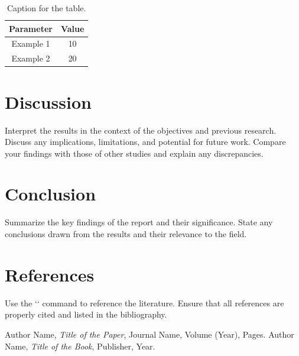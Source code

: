 \documentclass[12pt]{article}
\begin{document}
    \begin{table}[h!]
        \centering
        \begin{tabular}{|c|c|}
            \hline
            \textbf{Parameter} & \textbf{Value} \\
            \hline
            Example 1 & 10 \\
            Example 2 & 20 \\
            \hline
        \end{tabular}
        \caption{Caption for the table.}
        \label{tab:example}
    \end{table}

\section{Discussion}
    Interpret the results in the context of the objectives and previous research. Discuss any implications, limitations, and potential for future work. Compare your findings with those of other studies and explain any discrepancies.

\section{Conclusion}
    Summarize the key findings of the report and their significance. State any conclusions drawn from the results and their relevance to the field.

\section{References}
    Use the `\cite{}` command to reference the literature. Ensure that all references are properly cited and listed in the bibliography.

    \begin{thebibliography}{99}
         Author Name, \textit{Title of the Paper}, Journal Name, Volume (Year), Pages.
         Author Name, \textit{Title of the Book}, Publisher, Year.
    \end{thebibliography}
\end{document}
